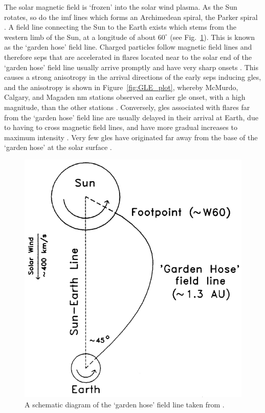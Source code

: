 The solar magnetic field is `frozen' into the solar wind plasma. As the Sun rotates, so do the \gls{imf} lines which forms an Archimedean spiral, the Parker spiral \citep{parker_dynamics_1958, parker_spiral_1976}. A field line connecting the Sun to the Earth exists which stems from the western limb of the Sun, at a longitude of about $60^{\circ}$ (see Fig.~\ref{fig:garden_hose}). This is known as the `garden hose' field line. Charged particles follow magnetic field lines and therefore \glspl{sep} that are accelerated in flares located near to the solar end of the `garden hose' field line usually arrive promptly and have very sharp onsets \citep{duldig_ground_1993, andriopoulou_intense_2011}. This causes a strong anisotropy in the arrival directions of the early \glspl{sep} inducing \glspl{gle}, and the anisotropy is shown in Figure~\ref{fig:GLE_plot}, whereby McMurdo, Calgary, and Magaden \gls{nm} stations observed an earlier \gls{gle} onset, with a high magnitude, than the other stations \citep{duldig_ground_1993, cramp_j._l._october_1997}. Conversely, \glspl{gle} associated with flares far from the `garden hose' field line are usually delayed in their arrival at Earth, due to having to cross magnetic field lines, and have more gradual increases to maximum intensity \citep{duldig_ground_1993}. Very few \glspl{gle} have originated far away from the base of the `garden hose' at the solar surface \citep{duldig_ground_1993, andriopoulou_intense_2011}.

\begin{figure}[ht!]
	\centering
	\includegraphics[width=0.75\columnwidth]{garden_hose.png}
	\caption{A schematic diagram of the `garden hose' field line taken from \cite{duldig_ground_1993}.}
	\label{fig:garden_hose}
\end{figure}

